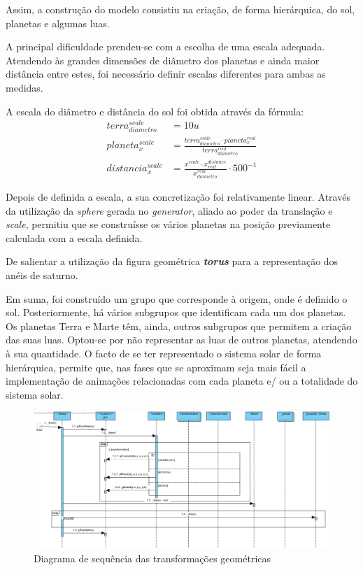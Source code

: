 \documentclass[runningheads]{llncs}
\begin{document}
Assim, a construção do modelo consistiu na criação, de 
forma hierárquica, do sol, planetas e algumas luas.

A principal dificuldade prendeu-se com a escolha de uma escala adequada.
Atendendo às grandes dimensões de diâmetro dos planetas e ainda maior distância entre estes,
foi necessário definir escalas diferentes para ambas as medidas.

A escala do diâmetro e distância do sol foi obtida através da fórmula:
\begin{align*}
    terra_{diametro}^{scale} & = 10 u \\
    planeta_{x}^{scale} &= \frac{terra_{diametro}^{scale} \cdot planeta_{x}^{real}}{terra_{diametro}^{real}} \\
    distancia_{x}^{scale} &= \frac{x^{scale}\cdot x^{distance}_{real}}{x_{diametro}^{real}} \cdot 500^{-1}
\end{align*}

Depois de definida a escala, a sua concretização foi relativamente linear.
Através da utilização da \textit{sphere} gerada no \textit{generator},
aliado ao poder da translação e \textit{scale}, permitiu que se construísse
os vários planetas na posição previamente calculada com a escala definida.

De salientar a utilização da figura geométrica \textbf{\textit{torus}} para 
a representação dos anéis de saturno.

Em suma, foi construído um grupo que corresponde à origem, onde é definido o sol.
Posteriormente, há vários subgrupos que identificam cada um dos planetas.
Os planetas Terra e Marte têm, ainda, outros subgrupos que permitem a
criação das suas luas.
Optou-se por não representar as luas de outros planetas, atendendo à sua quantidade.
O facto de se ter representado o sistema solar de forma hierárquica, 
permite que, nas fases que se aproximam seja mais fácil a implementação 
de animações relacionadas com cada planeta e/ ou a totalidade do sistema solar. 

\begin{landscape}
    \begin{figure}
        \centering
        \includegraphics[width=\linewidth]{assets/geom_transf.jpg}
        \caption{Diagrama de sequência das transformações geométricas} \label{fig:seq_transf_geom}
    \end{figure}
\end{landscape}
\end{document}

